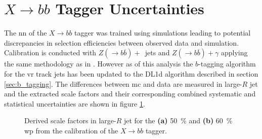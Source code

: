 \section{$X\rightarrow bb$ Tagger Uncertainties}
The \ac{nn} of the $X\rightarrow bb$ tagger was trained using simulations leading to potential discrepancies in selection efficiencies between observed data and simulation. Calibration is conducted with $Z(\rightarrow b\overline{b})+$~jets and $Z(\rightarrow b\overline{b})+\gamma$ applying the same methodology as in \citep{ATL-PHYS-PUB-2021-035}. However as of this analysis the $b$-tagging algorithm for the \ac{vr} track jets has been updated to the DL1d algorithm described in section \ref{sec:b_tagging}. The differences between \ac{mc} and data are measured in large-$R$ jet \pt and the extracted scale factors and their corresponding combined systematic and statistical uncertainties are shown in figure \ref{fig:xbb_sf}.
\begin{figure}
    \centering
    \caption[]{Derived scale factors in large-$R$ jet \pt for the \textbf{(a)} \qty[]{50}{\percent} and \textbf{(b)} \qty[]{60}{\percent} \ac{wp} from the calibration of the $X\rightarrow bb$ tagger.}
    \label{fig:xbb_sf}
\end{figure}

